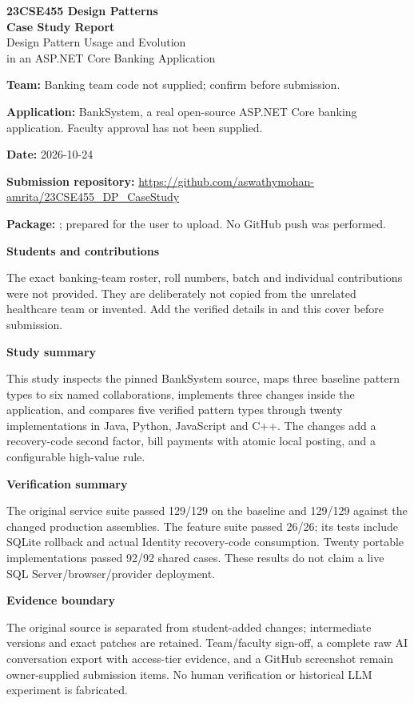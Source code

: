 \documentclass[11pt,a4paper]{article}
\newcommand{\entry}[2]{\textbf{#1:} #2\par}
\newcommand{\code}[1]{\texttt{\detokenize{#1}}}
\begin{document}
\begin{center}
{\Large\textbf{23CSE455 Design Patterns}}\\[6pt]
{\LARGE\textbf{Case Study Report}}\\[8pt]
{\large Design Pattern Usage and Evolution\\in an ASP.NET Core Banking Application}
\end{center}
\entry{Team}{Banking team code not supplied; confirm before submission.}
\entry{Application}{BankSystem, a real open-source ASP.NET Core banking application. Faculty approval has not been supplied.}
\entry{Date}{2026-10-24}
\entry{Submission repository}{\url{https://github.com/aswathymohan-amrita/23CSE455_DP_CaseStudy}}
\entry{Package}{\code{BankingCaseStudy/}; prepared for the user to upload. No GitHub push was performed.}
\textbf{Students and contributions}\par
The exact banking-team roster, roll numbers, batch and individual contributions were not provided. They are deliberately not copied from the unrelated healthcare team or invented. Add the verified details in \code{team.json} and this cover before submission.

\textbf{Study summary}\par
This study inspects the pinned BankSystem source, maps three baseline pattern types to six named collaborations, implements three changes inside the application, and compares five verified pattern types through twenty implementations in Java, Python, JavaScript and C++. The changes add a recovery-code second factor, bill payments with atomic local posting, and a configurable high-value rule.

\textbf{Verification summary}\par
The original service suite passed 129/129 on the baseline and 129/129 against the changed production assemblies. The feature suite passed 26/26; its tests include SQLite rollback and actual Identity recovery-code consumption. Twenty portable implementations passed 92/92 shared cases. These results do not claim a live SQL Server/browser/provider deployment.

\textbf{Evidence boundary}\par
The original source is separated from student-added changes; intermediate versions and exact patches are retained. Team/faculty sign-off, a complete raw AI conversation export with access-tier evidence, and a GitHub screenshot remain owner-supplied submission items. No human verification or historical LLM experiment is fabricated.
\clearpage
\end{document}
